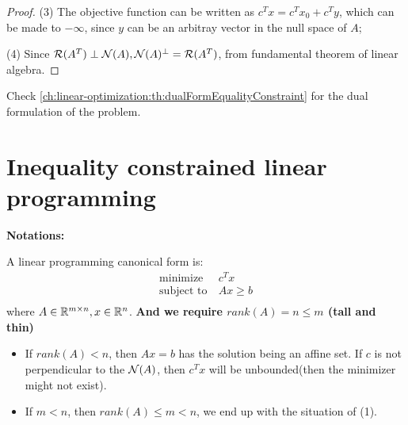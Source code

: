 \begin{refsection}
\begin{proof}
	(3) The objective function can be written as $c^Tx = c^Tx_0 + c^Ty$, which can be made to $-\infty$, since $y$ can be an arbitray vector in the null space of $A$;
	
	(4) Since $\mathcal{R}(A^T)\perp \mathcal{N}(A), \mathcal{N}(A)^\perp = \mathcal{R}(A^T)$, from fundamental theorem of linear algebra.
\end{proof}

\begin{remark}
Check \autoref{ch:linear-optimization:th:dualFormEqualityConstraint} for the dual formulation of the problem.
\end{remark}

\section{Inequality constrained linear programming}
\begin{mdframed}
\textbf{Notations:}\\
	
\end{mdframed}



\begin{definition}\label{ch:linear-optimization:def:canonicallinearoptimization}
	A linear programming canonical form is:
\begin{align*}
\text{minimize} ~ &c^Tx\\
\text{subject to} ~ & Ax\geq b\\
\end{align*}
where $A\in \mathbb{R}^{m\times n},x\in \mathbb{R}^n$.
\textbf{And we require $rank(A) = n \leq m$ (tall and thin)}
\end{definition}


\begin{remark}[Why we require $rank(A) = n$ and $m\geq n$]\hfill
\begin{itemize}
	\item If $rank(A) < n$, then $Ax = b$ has the solution being an affine set. If $c$ is not perpendicular to the $\mathcal{N}(A)$, then $c^Tx$ will be unbounded(then the minimizer might not exist).
	\item If $m < n$, then $rank(A)\leq m < n$, we end up with the situation of (1).
\end{itemize}
\end{remark}


\end{refsection}
